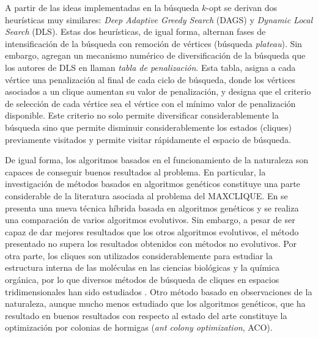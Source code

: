 \documentclass[conference]{IEEEtran}
\begin{document}
A partir de las ideas implementadas en la búsqueda $k$-opt se derivan
dos heurísticas muy similares: \emph{Deep Adaptive Greedy Search}
(DAGS) y \emph{Dynamic Local Search} (DLS). Estas dos heurísticas, de
igual forma, alternan fases de intensificación de la búsqueda con
remoción de vértices (búsqueda \emph{plateau}). Sin embargo, agregan
un mecanismo numérico de diversificación de la búsqueda que los
autores de DLS en \cite{dynamicl} llaman \emph{tabla de
  penalización}. Esta tabla, asigna a cada vértice una penalización al
final de cada ciclo de búsqueda, donde los vértices asociados a un
clique aumentan su valor de penalización, y designa que el criterio de
selección de cada vértice sea el vértice con el mínimo valor de
penalización disponible. Este criterio no solo permite diversificar
considerablemente la búsqueda sino que permite disminuir
considerablemente los estados (cliques) previamente visitados y
permite visitar rápidamente el espacio de búsqueda.

De igual forma, los algoritmos basados en el funcionamiento de la
naturaleza son capaces de conseguir buenos resultados al problema. En
particular, la investigación de métodos basados en algoritmos
genéticos constituye una parte considerable de la literatura asociada
al problema del \textsf{MAXCLIQUE}. En \cite{hybgen} se presenta una
nueva técnica híbrida basada en algoritmos genéticos y se realiza una
comparación de varios algoritmos evolutivos. Sin embargo, a pesar de
ser capaz de dar mejores resultados que los otros algoritmos
evolutivos, el método presentado no supera los resultados obtenidos
con métodos no evolutivos. Por otra parte, los cliques son utilizados
considerablemente para estudiar la estructura interna de las moléculas
en las ciencias biológicas y la química orgánica, por lo que diversos
métodos de búsqueda de cliques en espacios tridimensionales han sido
estudiados \cite{mce,protein}. Otro método basado en observaciones de
la naturaleza, aunque mucho menos estudiado que los algoritmos
genéticos, que ha resultado en buenos resultados con respecto al
estado del arte constituye la optimización por colonias de hormigas
(\emph{ant colony optimization}, ACO).
\end{document}
